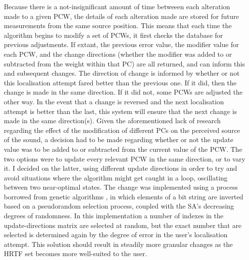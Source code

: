 Because there is a not-insignificant amount of time betweeen each alteration made to a given PCW, the details of each alteration made are stored for future measurements from the same source position. This means that each time the algorithm begins to modify a set of PCWs, it first checks the database for previous adjustments. If extant, the previous error value, the modifier value for each PCW, and the change directions (whether the modifier was added to or subtracted from the weight within that PC) are all returned, and can inform this and subsequent changes. The direction of change is informed by whether or not this localisation attempt fared better than the previous one. If it did, then the change is made in the same direction. If it did not, some PCWs are adjusted the other way. In the event that a change is reversed and the next localisation attempt is better than the last, this system will ensure that the next change is made in the same direction(s). Given the aforementioned lack of research regarding the effect of the modification of different PCs on the perceived source of the sound, a decision had to be made regarding whether or not the update value was to be added to or subtracted from the current value of the PCW. The two options were to update every relevant PCW in the same direction, or to vary it. I decided on the latter, using different update directions in order to try and avoid situations where the algorithm might get caught in a loop, oscillating between two near-optimal states. The change was implemented using a process borrowed from genetic algorithms \citep{Whitley1994}, in which elements of a bit string are inverted based on a pseudorandom selection  process, coupled with the SA's decreasing degrees of randomness. In this implementation a number of indexes in the update-directions matrix are selected at random, but the exact number that are selected is determined again by the degree of error in the user's localisation attempt. This solution should result in steadily more granular changes as the HRTF set becomes more well-suited to the user. 

